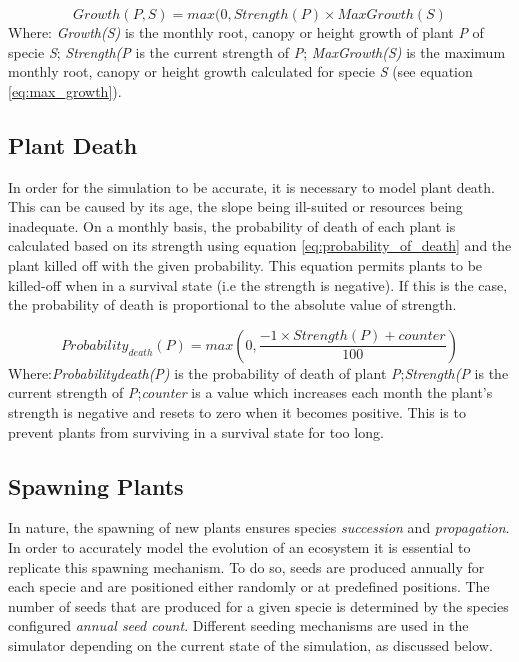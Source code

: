 \begin{equation}
Growth(\textit{P},S) = max(0, Strength(\textit{P}) \times  MaxGrowth(S)
\label{eq:actual_growth}
\end{equation}
Where: \textit{Growth(S)} is the monthly root, canopy or height growth of plant \textit{P} of specie \textit{S}; \textit{Strength(\textit{P}} is the current strength of \textit{P}; \textit{MaxGrowth(S)} is the maximum monthly root, canopy or height growth calculated for specie \textit{S} (see equation \ref{eq:max_growth}).

\subsection{Plant Death}

In order for the simulation to be accurate, it is necessary to model plant death. This can be caused by its age, the slope being ill-suited or resources being inadequate. On a monthly basis, the probability of death of each plant is calculated based on its strength using equation \ref{eq:probability_of_death} and the plant killed off with the given probability. This equation permits plants to be killed-off when in a survival state (i.e the strength is negative). If this is the case, the probability of death is proportional to the absolute value of strength. 

\begin{equation}
Probability_{death}(P) = max(0, \frac{-1 \times Strength(P) + counter}{100})
\label{eq:probability_of_death}
\end{equation}
Where:\textit{Probability{death}(P)} is the probability of death of plant \textit{P};\textit{Strength(\textit{P}} is the current strength of \textit{P};\textit{counter} is a value which increases each month the plant's strength is negative and resets to zero when it becomes positive. This is to prevent plants from surviving in a survival state for too long.

\subsection{Spawning Plants} \label{subsec:spawning_plants}

In nature, the spawning of new plants ensures species \textit{succession} and \textit{propagation}. In order to accurately model the evolution of an ecosystem it is essential to replicate this spawning mechanism. To do so, seeds are produced annually for each specie and are positioned either randomly or at predefined positions. The number of seeds that are produced for a given specie is determined by the species configured \textit{annual seed count}. Different seeding mechanisms are used in the simulator depending on the current state of the simulation, as discussed below.\\ 

